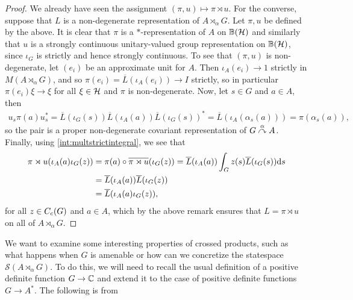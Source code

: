\begin{proof}
We already have seen the assignment $(\pi,u) \mapsto \pi \rtimes u$. For the converse, suppose that $L$ is a non-degenerate representation of $A \rtimes_\alpha G$. Let $\pi, u$ be defined by the above. It is clear that $\pi$ is a $*$-representation of $A$ on $\mathbb{B}(\mathcal{H})$ and similarly that $u$ is a strongly continuous unitary-valued group representation on $\mathbb{B}(\mathcal{H})$, since $\iota_G$ is strictly and hence strongly continuous. To see that $(\pi,u)$ is non-degenerate, let $(e_i)$ be an approximate unit for $A$. Then $\iota_A(e_i) \to 1$ strictly in $M(A \rtimes_\alpha G)$, and so $\pi(e_i) = \overline L(\iota_A(e_i)) \to I$ strictly, so in particular $\pi(e_i) \xi \to \xi$ for all $\xi \in \mathcal{H}$ and $\pi$ is non-degenerate. Now, let $s \in G$ and $a \in A$, then
\begin{align*}
	u_s \pi(a) u_s^* = \overline L(\iota_G(s) ) \overline L (\iota_A(a)) \overline L(\iota_G(s))^* = \overline L( \iota_A(\alpha_s(a))) = \pi(\alpha_{s}(a)),
\end{align*}
so the pair is a proper non-degenerate covariant representation of $G \stackrel{\alpha}{\curvearrowright} A$. Finally, using \cref{int:multstrictintegral}, we see that
\begin{align*}
\pi \rtimes u(\iota_A(a) \iota_G(z)) &= \pi(a) \circ \overline{\pi \rtimes u}(\iota_G(z)) = \overline L(\iota_A(a)) \int_G z(s) \overline L(\iota_G(s)) \mathrm{d} s \\
&= \overline L(\iota_A(a)) \overline L(\iota_G(z)) \\
&= \overline L(\iota_A(a) \iota_G(z)),
\end{align*}
for all $z \in C_c(G)$ and $a \in A$, which by the above remark ensures that $L = \pi \rtimes u$ on all of $A \rtimes_ \alpha G$.
\end{proof}

We want to examine some interesting properties of crossed products, such as what happens when $G$ is amenable or how can we concretize the statespace $\mathcal{S}(A\rtimes_\alpha G)$. To do this, we will need to recall the usual definition of a positive definite function $G \to \mathbb{C}$ and extend it to the case of positive definite functions $G \to A^*$. The following is from \cite{pedersenalgauto}

